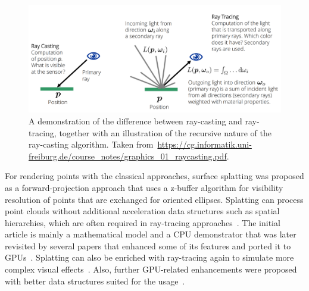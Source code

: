 \begin{figure}
    \centering
    \includegraphics[width=.9\textwidth]{../graphics/casting-tracing.png}
    \caption[Ray-casting vs. ray-tracing]{A demonstration of the difference between
    ray-casting and ray-tracing, together with an illustration of the recursive nature
    of the ray-casting algorithm. Taken from~\url{https://cg.informatik.uni-freiburg.de/course_notes/graphics_01_raycasting.pdf}.}\label{fig:casting_tracing}
\end{figure}

For rendering points with the classical approaches, surface splatting was proposed as a forward-projection approach that uses a z-buffer
algorithm for visibility resolution of points that are exchanged for oriented ellipses. Splatting can process point clouds
without additional acceleration data structures such as spatial hierarchies, which are
often required in ray-tracing approaches~\citep{PointRendering}. The initial article is mainly
a mathematical model and a CPU demonstrator that was later revisited by several papers that enhanced some of its
features and ported it to GPUs~\citep{Splatting2, Splatting3, Splatting4, Splatting5, Splatting6}.
Splatting can also be enriched with ray-tracing again to simulate more complex visual effects~\citep{SplattingTracing}.
Also, further GPU-related enhancements were proposed with better data structures suited for the usage~\citep{SequentialTrees}.\\

